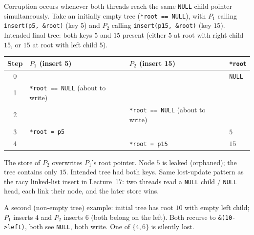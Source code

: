 \documentclass[11pt,a4paper]{article}
\newenvironment{Sol}{%
  \begin{tcolorbox}[sboxstyle, title={Solution}]%
}{%
  \end{tcolorbox}\vspace{0.35em}%
}
\begin{document}
\begin{Sol}
Corruption occurs whenever both threads reach the same \texttt{NULL} child pointer simultaneously. Take an initially empty tree (\texttt{*root == NULL}), with $P_1$ calling \texttt{insert(p5, \&root)} (key $5$) and $P_2$ calling \texttt{insert(p15, \&root)} (key $15$). Intended final tree: both keys $5$ and $15$ present (either $5$ at root with right child $15$, or $15$ at root with left child $5$).

\begin{center}
\begin{tabular}{c|l|l|l}
Step & $P_1$ (insert 5) & $P_2$ (insert 15) & \texttt{*root} \\
\hline
0 & & & \texttt{NULL} \\
1 & \texttt{*root == NULL} (about to write) & & \\
2 & & \texttt{*root == NULL} (about to write) & \\
3 & \texttt{*root = p5} & & $5$ \\
4 & & \texttt{*root = p15} & $15$ \\
\end{tabular}
\end{center}

The store of $P_2$ overwrites $P_1$'s root pointer. Node $5$ is leaked (orphaned); the tree contains only $15$. Intended tree had both keys. Same lost-update pattern as the racy linked-list insert in Lecture~17: two threads read a \texttt{NULL} child / \texttt{NULL} head, each link their node, and the later store wins.

A second (non-empty tree) example: initial tree has root $10$ with empty left child; $P_1$ inserts $4$ and $P_2$ inserts $6$ (both belong on the left). Both recurse to \texttt{\&(10->left)}, both see \texttt{NULL}, both write. One of $\{4,6\}$ is silently lost.
\end{Sol}
\end{document}
